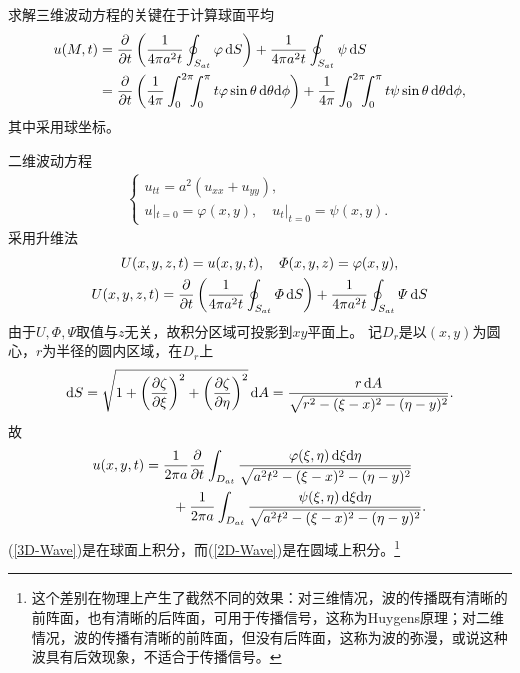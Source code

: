 求解三维波动方程的关键在于计算球面平均
\begin{align}\label{3D-Wave}
	u(M,t) & =\pp t\kh{\frac1{4\pi a^2t}\oint_{S_{at}}\varphi\d S}+\frac1{4\pi a^2t}\oint_{S_{at}}\psi\d S\\\notag
	& =\pp t\kh{\frac1{4\pi}\int_0^{2\pi}\bs5\int_0^\pi t\varphi\sin\theta\d\theta\nd\phi}+\frac1{4\pi}\int_0^{2\pi}\bs5\int_0^\pi t\psi\sin\theta\d\theta\nd\phi,
\end{align}
其中采用球坐标。
\iffalse
\begin{align*}
	\varphi\begin{pmatrix}
		\xi \\\eta\\\zeta
	\end{pmatrix}=\varphi\begin{pmatrix}
		x+at\sin\theta\cos\phi \\
		y+at\sin\theta\sin\phi \\
		z+at\cos\theta
	\end{pmatrix}.
\end{align*}
\fi
\eg 二维波动方程
\begin{align*}
	\begin{cases}
		u_{tt}=a^2(u_{xx}+u_{yy}), \\
		u|_{t=0}=\varphi(x,y),\quad u_t|_{t=0}=\psi(x,y).
	\end{cases}
\end{align*}
采用升维法
\begin{gather*}
	U(x,y,z,t)=u(x,y,t),\quad\varPhi(x,y,z)=\varphi(x,y),\\
	U(x,y,z,t)=\frac{\partial^{\;\!\!}}{\partial t^{\;\!\!}}\left(\frac1{4\pi a^2t}\oint_{S_{at}}\varPhi\mathop{}\!\mathrm{d} S\right)+\frac1{4\pi a^2t}\oint_{S_{at}}\varPsi\mathop{}\!\mathrm{d} S
\end{gather*}
由于$U,\varPhi,\varPsi$取值与$z$无关，故积分区域可投影到$xy$平面上。
记$D_r$是以$(x,y)$为圆心，$r$为半径的圆内区域，在$D_r$上
\[\d S=\sqrt{1+\kh{\pv\zeta\xi}^2+\kh{\pv\zeta\eta}^2}\d A=\frac{r\d A}{\sqrt{r^2-(\xi-x)^2-(\eta-y)^2}}.\]
故
\begin{align}\label{2D-Wave}
	\begin{aligned}
		u(x,y,t)&= \frac1{2\pi a}\frac{\partial^{\;\!\!}}{\partial t^{\;\!\!}}\int_{D_{at}}\frac{\varphi(\xi,\eta)\mathop{}\!\mathrm{d}\xi\mathrm{d}\eta}{\sqrt{a^2t^2-(\xi-x)^2-(\eta-y)^2}} \\
		&\qquad +\frac1{2\pi a}\int_{D_{at}}\frac{\psi(\xi,\eta)\mathop{}\!\mathrm{d}\xi\mathrm{d}\eta}{\sqrt{a^2t^2-(\xi-x)^2-(\eta-y)^2}}.
	\end{aligned}
\end{align}
(\ref{3D-Wave})是在球面上积分，而(\ref{2D-Wave})是在圆域上积分。\footnote{这个差别在物理上产生了截然不同的效果：对三维情况，波的传播既有清晰的前阵面，也有清晰的后阵面，可用于传播信号，这称为Huygens原理；对二维情况，波的传播有清晰的前阵面，但没有后阵面，这称为波的弥漫，或说这种波具有后效现象，不适合于传播信号。}


